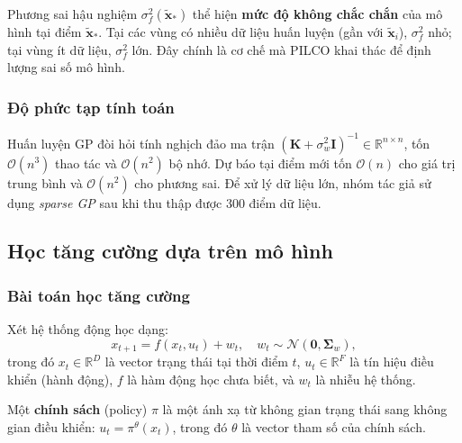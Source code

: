 \begin{nx}
    Phương sai hậu nghiệm $\sigma^2_f(\tilde{\mathbf{x}}_*)$ thể hiện \textbf{mức độ không chắc chắn} của mô hình tại điểm $\tilde{\mathbf{x}}_*$. Tại các vùng có nhiều dữ liệu huấn luyện (gần với $\tilde{\mathbf{x}}_i$), $\sigma^2_f$ nhỏ; tại vùng ít dữ liệu, $\sigma^2_f$ lớn. Đây chính là cơ chế mà PILCO khai thác để định lượng sai số mô hình.
\end{nx}

\subsubsection{Độ phức tạp tính toán}
\label{SUB_SUB_SEC_complexity}

Huấn luyện GP đòi hỏi tính nghịch đảo ma trận $(\mathbf{K} + \sigma_w^2 \mathbf{I})^{-1} \in \mathbb{R}^{n \times n}$, tốn $\mathcal{O}(n^3)$ thao tác và $\mathcal{O}(n^2)$ bộ nhớ. Dự báo tại điểm mới tốn $\mathcal{O}(n)$ cho giá trị trung bình và $\mathcal{O}(n^2)$ cho phương sai. Để xử lý dữ liệu lớn, nhóm tác giả sử dụng \textit{sparse GP} \cite{Snelson_Ghahramani_2006} sau khi thu thập được 300 điểm dữ liệu.
\medskip

\subsection{Học tăng cường dựa trên mô hình}
\label{SUB_SEC_model_based_RL}

\subsubsection{Bài toán học tăng cường}
\label{SUB_SUB_SEC_RL_problem}

Xét hệ thống động học dạng:
\begin{equation}
    x_{t+1} = f(x_t, u_t) + w_t, \quad w_t \sim \mathcal{N}(\mathbf{0}, \boldsymbol{\Sigma}_w),
    \label{he_dong_hoc}
\end{equation}
trong đó $x_t \in \mathbb{R}^D$ là vector trạng thái tại thời điểm $t$, $u_t \in \mathbb{R}^F$ là tín hiệu điều khiển (hành động), $f$ là hàm động học chưa biết, và $w_t$ là nhiễu hệ thống.

\begin{dn}
\label{DN_chinh_sach}
    Một \textbf{chính sách} (policy) $\pi$ là một ánh xạ từ không gian trạng thái sang không gian điều khiển: $u_t = \pi^\theta(x_t)$, trong đó $\theta$ là vector tham số của chính sách.
\end{dn}


